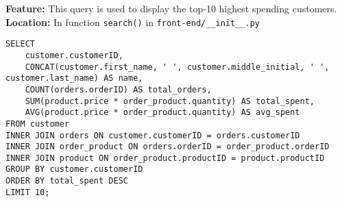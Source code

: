 \textbf{Feature:} This query is used to display the top-10 highest spending customers. \\
\textbf{Location:} In function \texttt{search()} in \texttt{front-end/\_\_init\_\_.py}

\begin{lstlisting}
SELECT
    customer.customerID,
    CONCAT(customer.first_name, ' ', customer.middle_initial, ' ', customer.last_name) AS name,
    COUNT(orders.orderID) AS total_orders,
    SUM(product.price * order_product.quantity) AS total_spent,
    AVG(product.price * order_product.quantity) AS avg_spent
FROM customer
INNER JOIN orders ON customer.customerID = orders.customerID
INNER JOIN order_product ON orders.orderID = order_product.orderID
INNER JOIN product ON order_product.productID = product.productID
GROUP BY customer.customerID
ORDER BY total_spent DESC
LIMIT 10;
\end{lstlisting}